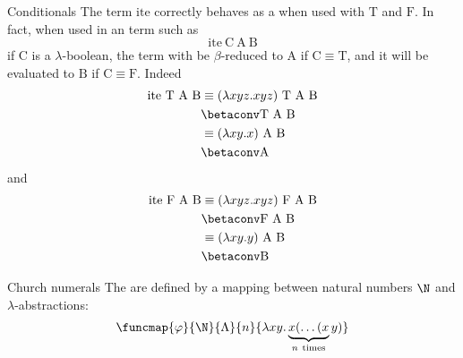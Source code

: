 \documentclass[a4paper, 12pt]{report}
\begin{document}
    \begin{framedobs}{Conditionals}
        The term $\mathrm{ite}$ correctly behaves as a  when used with $\mathrm T$ and $\mathrm F$. In fact, when used in an term such as $$\mathrm{ite} \ \mathrm C \ \mathrm A \ \mathrm B$$ if $\mathrm C$ is a $\lambda$-boolean, the term with be $\beta$-reduced to $\mathrm A$ if $\mathrm C \equiv \mathrm T$, and it will be evaluated to $\mathrm B$ if $\mathrm C \equiv \mathrm F$. Indeed
        \begin{equation*}
            \begin{split}
                \mathrm{ite} \  \mathrm T \ \mathrm A \ \mathrm B &\equiv (\lambda xyz.xyz) \ \mathrm T \ \mathrm A \ \mathrm B \\
                                                                  &\betaconv \mathrm T \ \mathrm A \ \mathrm B \\
                                                                  &\equiv (\lambda xy.x) \ \mathrm A \ \mathrm B \\
                                                                  &\betaconv \mathrm A \\
            \end{split}
        \end{equation*}
        and
        \begin{equation*}
            \begin{split}
                \mathrm{ite} \  \mathrm F \ \mathrm A \ \mathrm B &\equiv (\lambda xyz.xyz) \ \mathrm F \ \mathrm A \ \mathrm B \\
                                                                  &\betaconv \mathrm F \ \mathrm A \ \mathrm B \\
                                                                  &\equiv (\lambda xy.y) \ \mathrm A \ \mathrm B \\
                                                                  &\betaconv \mathrm B \\
            \end{split}
        \end{equation*}
    \end{framedobs}

    \begin{frameddefn}{Church numerals}
        The  are defined by a mapping between natural numbers $\N$ and $\lambda$-abstractions: $$\funcmap{\varphi}{\N}{\Lambda}{n}{\lambda xy. \underbrace{x ( \ldots ( x}_{n \ \mathrm{times}}y)}$$
    \end{frameddefn}
\end{document}
